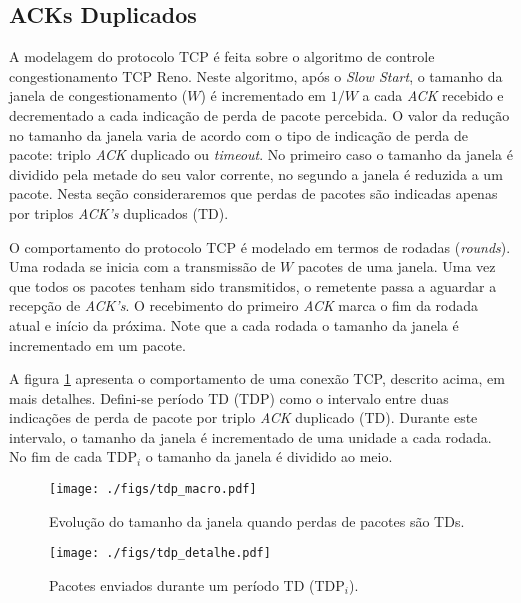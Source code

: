 
\subsection{ACKs Duplicados}
A modelagem do protocolo TCP é feita sobre o algoritmo de controle congestionamento TCP Reno.
Neste algoritmo, após o \textit{Slow Start}, o tamanho da janela de congestionamento ($W$) é 
incrementado em $1/W$ a cada \textit{ACK} recebido e decrementado a cada indicação de perda 
de pacote percebida. O valor da redução no tamanho da janela varia de acordo com o tipo de indicação de
perda de pacote: triplo \textit{ACK} duplicado ou \textit{timeout}. No primeiro caso o tamanho
da janela é dividido pela metade do seu valor corrente, no segundo a janela é reduzida a um 
pacote. Nesta seção consideraremos que perdas de pacotes são indicadas apenas por triplos 
\textit{ACK's} duplicados (TD).

O comportamento do protocolo TCP é modelado em termos de rodadas (\textit{rounds}). Uma rodada
se inicia com a transmissão de $W$ pacotes de uma janela. Uma vez que todos os pacotes tenham sido 
transmitidos, o remetente passa a aguardar a recepção de \textit{ACK's}. O recebimento do primeiro 
\textit{ACK} marca o fim da rodada atual e início da próxima. Note que a cada rodada o tamanho da 
janela é incrementado em um pacote.

A figura \ref{fig:tdp_macro} apresenta o comportamento de uma conexão TCP, descrito acima, em mais detalhes. 
Defini-se período TD (TDP) como o intervalo entre duas indicações de perda de pacote por triplo \textit{ACK} 
duplicado (TD). Durante este intervalo, o tamanho da janela é incrementado de uma unidade a cada rodada. 
No fim de cada TDP$_{i}$ o tamanho da janela é dividido ao meio.

\begin{figure}[ht]
  \centering
  \texttt{[image: ./figs/tdp\_macro.pdf]}
  \caption{Evolução do tamanho da janela quando perdas de pacotes são TDs.}
  \label{fig:tdp_macro}
\end{figure}


\begin{figure}[ht]
  \centering
  \texttt{[image: ./figs/tdp\_detalhe.pdf]}
  \caption{Pacotes enviados durante um período TD (TDP$_{i}$).}
  \label{fig:tdp_detalhe}
\end{figure}
